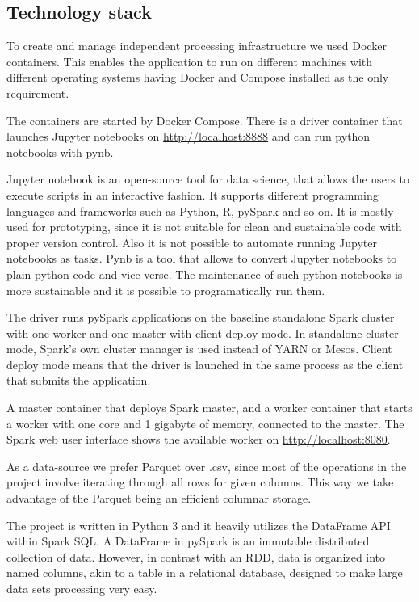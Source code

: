 \subsection{Technology stack}
To create and manage independent processing infrastructure we used Docker containers. This enables the application to run on different machines with different operating systems having Docker and Compose installed as the only requirement. 

The containers are started by Docker Compose. There is a driver container that launches Jupyter notebooks on \url{http://localhost:8888} and can run python notebooks with pynb. 

Jupyter notebook is an open-source tool for data science, that allows the users to execute scripts in an interactive fashion. It supports different programming languages and frameworks such as Python, R, pySpark and so on. It is mostly used for prototyping, since it is not suitable for clean and sustainable code with proper version control. Also it is not possible to automate running Jupyter notebooks as tasks. 
Pynb is a tool that allows to convert Jupyter notebooks to plain python code and vice verse. The maintenance of such python notebooks is more sustainable and it is possible to programatically run them. \cite{pynb}

The driver runs pySpark applications on the baseline standalone Spark cluster with one worker and one master with client deploy mode. In standalone cluster mode, Spark's own cluster manager is used instead of YARN or Mesos. Client deploy mode means that  the driver is launched in the same process as the client that submits the application. 

A master container that deploys Spark master, and a worker container that starts a worker with one core and 1 gigabyte of memory, connected to the master. The Spark web user interface shows the available worker on \url{http://localhost:8080}.

As a data-source we prefer Parquet over .csv, since most of the operations in the project involve iterating through all rows for given columns. This way we take advantage of the Parquet being an efficient columnar storage.

The project is written in Python 3 and it heavily utilizes the DataFrame API within Spark SQL. A DataFrame in pySpark is an immutable distributed collection of data. However, in contrast with an RDD, data is organized into named columns, akin to a table in a relational database, designed to make large data sets processing very easy.

